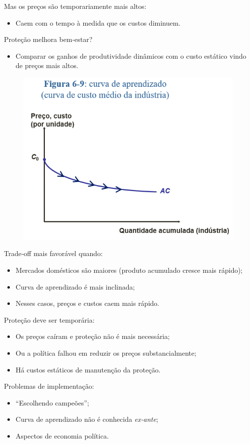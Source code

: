 \documentclass[a4paper,12pt]{article}[abntex2]
\begin{document}
Mas os preços são temporariamente mais altos:
\begin{itemize}
  \item Caem com o tempo à medida que os custos diminuem.
\end{itemize}

Proteção melhora bem‐estar?
\begin{itemize}
  \item Comparar os ganhos de produtividade dinâmicos com o custo estático vindo de preços mais altos.
\end{itemize}

\begin{figure}[H]
    \centering
    \includegraphics[width=0.7\linewidth]{Imagens/a19i3.png}
\end{figure}

Trade‐off mais favorável quando:
\begin{itemize}
  \item Mercados domésticos são maiores (produto acumulado cresce mais rápido);
  \item Curva de aprendizado é mais inclinada;
  \item Nesses casos, preços e custos caem mais rápido.
\end{itemize}

Proteção deve ser temporária:
\begin{itemize}
  \item Os preços caíram e proteção não é mais necessária;
  \item Ou a política falhou em reduzir os preços substancialmente;
  \item Há custos estáticos de manutenção da proteção.
\end{itemize}

Problemas de implementação:
\begin{itemize}
  \item “Escolhendo campeões”;
  \item Curva de aprendizado não é conhecida \textit{ex‐ante};
  \item Aspectos de economia política.
\end{itemize}
\end{document}
